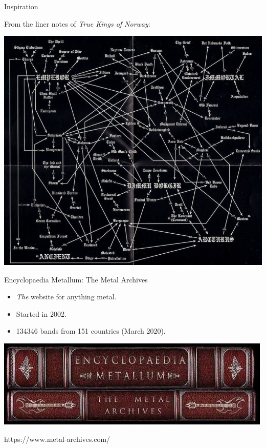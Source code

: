 \documentclass{beamer}
\begin{document}
    \begin{frame}{Inspiration}
    
      From the liner notes of \textit{True Kings of Norway}:
    
      \begin{center}
        \includegraphics[scale=2.3]{true_kings_diagram}
      \end{center}
      
    \end{frame}
    
    \begin{frame}{Encyclopaedia Metallum: The Metal Archives}
    
      \begin{itemize}
        \item \textit{The} website for anything metal.
        \item Started in 2002.
        \item 134346 bands from 151 countries (March 2020).
      \end{itemize}
    
      \begin{center}
        \includegraphics[scale=.4]{MA_banner}
      \end{center}
      
      https://www.metal-archives.com/
      
    \end{frame}
\end{document}
